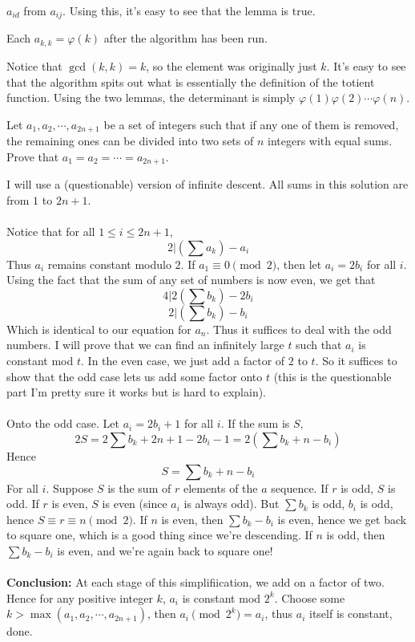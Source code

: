 \documentclass[11pt]{scrartcl}
\begin{document}
$a_{id}$ from $a_{ij}$. Using this, it's easy to see that the lemma is true.
\begin{lemma}
  Each $a_{k,k}=\varphi(k)$ after the algorithm has been run.
\end{lemma}
Notice that $\gcd(k,k)=k$, so the element was originally just $k$. It's easy to see that the algorithm spits out what is essentially
the definition of the totient function.
\newline \newline
Using the two lemmas, the determinant is simply $\varphi(1)\varphi(2)\cdots\varphi(n)$.
\newpage
\begin{example}
  Let $a_1, a_2, \cdots, a_{2n+1}$ be a set of integers such that if any one
  of them is removed, the remaining ones can be divided into two sets of
  $n$ integers with equal sums. Prove that $a_1=a_2=\cdots=a_{2n+1}$.
\end{example}
\begin{soln}
  I will use a (questionable) version of infinite descent. All sums in this solution
  are from $1$ to $2n+1$.
  \\ \\
  Notice that for all $1\le i\le 2n+1$,
  $$2|\left(\sum a_k\right)-a_i$$
  Thus $a_i$ remains constant modulo $2$.
  If $a_1\equiv 0\pmod{2}$, then let $a_i=2b_i$ for all $i$.
  Using the fact that the sum of any set of numbers is now even, we get that
  $$4|2\left(\sum b_k\right)-2b_i$$
  $$2|\left(\sum b_k\right)-b_i$$
  Which is identical to our equation for $a_n$. Thus it suffices to deal with
  the odd numbers. I will prove that we can find an infinitely large $t$ such
  that $a_i$ is constant mod $t$. In the even case, we just add a factor of
  $2$ to $t$. So it suffices to show that the odd case lets us add some factor
  onto $t$ (this is the questionable part \-\- I'm pretty sure it works but is hard to explain).
  \\ \\
  Onto the odd case. Let $a_i=2b_i+1$ for all $i$. If the sum is $S$,
  $$2S=2\sum b_k+2n+1-2b_i-1=2\left(\sum b_k+n-b_i\right)$$
  Hence
  $$S=\sum b_k +n-b_i$$
  For all $i$. Suppose $S$ is the sum of $r$ elements of the $a$ sequence. If $r$ is odd, $S$ is odd. If $r$ is even, $S$ is even (since $a_i$ is always odd).
  But $\sum b_k$ is odd, $b_i$ is odd, hence $S\equiv r\equiv n\pmod{2}$. If $n$ is even, then $\sum b_k-b_i$ is even, hence we get back to square one,
  which is a good thing since we're descending. If $n$ is odd, then $\sum b_k -b_i$ is even, and we're again back to square one!
  \\ \\
  \textbf{Conclusion: } At each stage of this simplifiication, we add on a factor of two. Hence for any positive integer $k$,
  $a_i$ is constant mod $2^k$. Choose some $k>\max(a_1, a_2,\cdots, a_{2n+1})$, then $a_i\pmod{2^k}=a_i$, thus $a_i$ itself is constant, done.
\end{soln}
\end{document}
